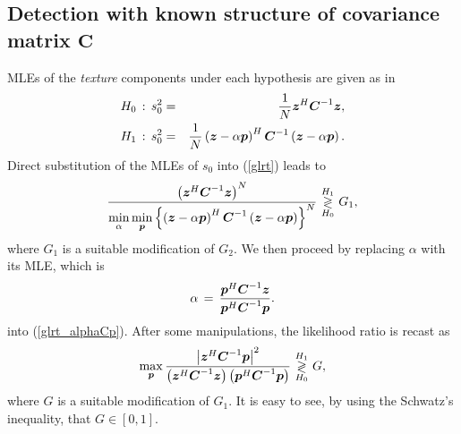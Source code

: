 \subsection{Detection with known structure of covariance matrix $\boldsymbol{C}$}
MLEs of the \textit{texture} components under each hypothesis are given as in \cite{Conte_Apr02}
\begin{eqnarray}\label{texture_mle}
  H_0 \thinspace : \thinspace s_0^2 &=& \frac{1}{N} \boldsymbol{z}^H \boldsymbol{C}^{-1} \boldsymbol{z}, \\
  H_1 \thinspace : \thinspace s_0^2 &=& \frac{1}{N}
\left ( \boldsymbol{z} - \alpha \boldsymbol{p} \right  )^H \boldsymbol{C}^{-1}\left ( \boldsymbol{z} - \alpha \boldsymbol{p} \right  ).
\end{eqnarray}
Direct substitution of the MLEs
of $s_0$ into (\ref{glrt}) leads to
\begin{equation}\label{glrt_alphaCp}
\frac{\left(\boldsymbol{z}^H \boldsymbol{C}^{-1} \boldsymbol{z}\right)^N}
{\min \limits_{\alpha}
 \min \limits_{\boldsymbol{p}}
  \left \{ \left ( \boldsymbol{z} - \alpha \boldsymbol{p} \right  )^H \boldsymbol{C}^{-1}\left ( \boldsymbol{z} - \alpha \boldsymbol{p} \right  )\right\}^N
  }
 \thinspace\mathop{\gtrless}_{H_0}^{H_1}\thinspace G_1,
\end{equation}
where $G_1$ is a suitable modification of $G_2$.
We then proceed by replacing $\alpha$ with its MLE, which is \cite{Conte95}
\begin{equation}\label{alpha_mle}
\alpha \thinspace = \thinspace
\frac{\boldsymbol{p}^H \boldsymbol{C}^{-1} \boldsymbol{z}}
{\boldsymbol{p}^H \boldsymbol{C}^{-1} \boldsymbol{p}}.
\end{equation}
into (\ref{glrt_alphaCp}).
After some manipulations, the likelihood ratio is recast as
\begin{equation}\label{glrt_equi}
\max \limits_{\boldsymbol{p}}
\frac{\left |\boldsymbol{z}^H \boldsymbol{C}^{-1}\boldsymbol{p} \right |^2}
     { \left (\boldsymbol{z}^H \boldsymbol{C}^{-1} \boldsymbol{z} \right )
   \left (\boldsymbol{p}^H \boldsymbol{C}^{-1} \boldsymbol{p} \right )}
   \thinspace\mathop{\gtrless}_{H_0}^{H_1}\thinspace G,
\end{equation}
where $G$ is a suitable modification of $G_1$.
It is easy to see,
by using the Schwatz's inequality,
 that $G \in [0,1]$.
